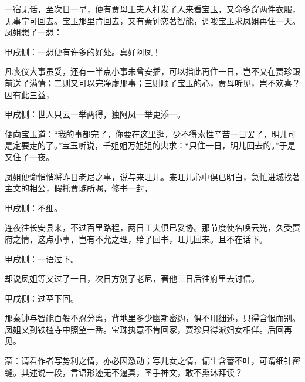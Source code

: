 \begin{parag}
    一宿无话，至次日一早，便有贾母王夫人打发了人来看宝玉，又命多穿两件衣服，无事宁可回去。宝玉那里肯回去，又有秦钟恋著智能，调唆宝玉求凤姐再住一天。凤姐想了一想：\begin{note}甲戌侧：一想便有许多的好处。真好阿凤！\end{note}凡丧仪大事虽妥，还有一半点小事未曾安插，可以指此再住一日，岂不又在贾珍跟前送了满情；二则又可以完净虚那事；三则顺了宝玉的心，贾母听见，岂不欢喜？因有此三益，\begin{note}甲戌侧：世人只云一举两得，独阿凤一举更添一。\end{note}便向宝玉道：“我的事都完了，你要在这里逛，少不得索性辛苦一日罢了，明儿可是定要走的了。”宝玉听说，千姐姐万姐姐的央求：“只住一日，明儿回去的。”于是又住了一夜。
\end{parag}


\begin{parag}
    凤姐便命悄悄将昨日老尼之事，说与来旺儿。来旺儿心中俱已明白，急忙进城找著主文的相公，假托贾琏所嘱，修书一封，\begin{note}甲戌侧：不细。\end{note}连夜往长安县来，不过百里路程，两日工夫俱已妥协。那节度使名唤云光，久受贾府之情，这点小事，岂有不允之理，给了回书，旺儿回来。且不在话下。\begin{note}甲戌侧：一语过下。\end{note}
\end{parag}


\begin{parag}
    却说凤姐等又过了一日，次日方别了老尼，著他三日后往府里去讨信。\begin{note}甲戌侧：过至下回。\end{note}那秦钟与智能百般不忍分离，背地里多少幽期密约，俱不用细述，只得含恨而别。凤姐又到铁槛寺中照望一番。宝珠执意不肯回家，贾珍只得派妇女相伴。后回再见。
\end{parag}


\begin{parag}
    \begin{note}蒙：请看作者写势利之情，亦必因激动；写儿女之情，偏生含蓄不吐，可谓细针密缝。其述说一段，言语形迹无不逼真，圣手神文，敢不熏沐拜读？\end{note}
\end{parag}